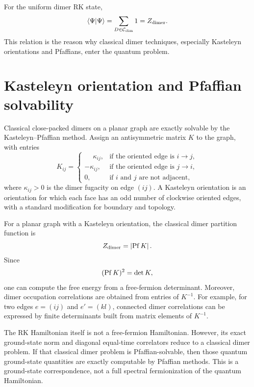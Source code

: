 For the uniform dimer RK state,
\begin{equation}
\label{eq:rk-norm-classical-partition-function}
    \left\langle \Psi\middle|\Psi\right\rangle
    =
    \sum_{D\in\mathcal{C}_{\rm dim}}1
    =
    Z_{\rm dimer} .
\end{equation}
This relation is the reason why classical dimer techniques, especially
Kasteleyn orientations and Pfaffians, enter the quantum problem.

\section{Kasteleyn orientation and Pfaffian solvability}
\label{sec:kasteleyn-pfaffian-dimers}

Classical close-packed dimers on a planar graph are exactly solvable by the
Kasteleyn--Pfaffian method.  Assign an antisymmetric matrix \(K\) to the graph,
with entries
\begin{equation}
\label{eq:kasteleyn-matrix-definition}
    K_{ij}
    =
    \begin{cases}
        \phantom{-}\kappa_{ij}, & \text{if the oriented edge is }i\to j,\\
        -\kappa_{ij}, & \text{if the oriented edge is }j\to i,\\
        0, & \text{if }i\text{ and }j\text{ are not adjacent},
    \end{cases}
\end{equation}
where \(\kappa_{ij}>0\) is the dimer fugacity on edge \((ij)\).  A Kasteleyn
orientation is an orientation for which each face has an odd number of clockwise
oriented edges, with a standard modification for boundary and topology.

For a planar graph with a Kasteleyn orientation, the classical dimer partition
function is
\begin{equation}
\label{eq:dimer-partition-pfaffian}
    Z_{\rm dimer}=\left|\operatorname{Pf} K\right| .
\end{equation}
Since
\begin{equation}
\label{eq:pfaffian-determinant-relation}
    (\operatorname{Pf} K)^2=\det K,
\end{equation}
one can compute the free energy from a free-fermion determinant.  Moreover,
dimer occupation correlations are obtained from entries of \(K^{-1}\).  For
example, for two edges \(e=(ij)\) and \(e'=(kl)\), connected dimer correlations
can be expressed by finite determinants built from matrix elements of
\(K^{-1}\).

\begin{remark}
The RK Hamiltonian itself is not a free-fermion Hamiltonian.  However, its
exact ground-state norm and diagonal equal-time correlators reduce to a
classical dimer problem.  If that classical dimer problem is Pfaffian-solvable,
then those quantum ground-state quantities are exactly computable by Pfaffian
methods.  This is a ground-state correspondence, not a full spectral
fermionization of the quantum Hamiltonian.
\end{remark}

